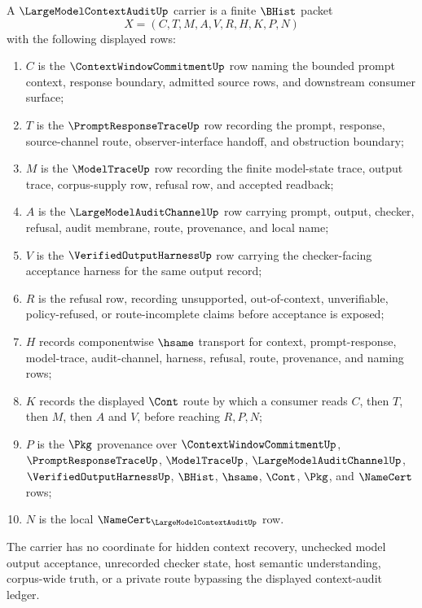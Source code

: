 \begin{definition}
\label{def:large-model-context-audit-carrier}
A $\LargeModelContextAuditUp$ carrier is a finite $\BHist$ packet
$$
X=(C,T,M,A,V,R,H,K,P,N)
$$
with the following displayed rows:
\begin{enumerate}
\item $C$ is the $\ContextWindowCommitmentUp$ row naming the bounded prompt context, response boundary, admitted source rows, and downstream consumer surface;
\item $T$ is the $\PromptResponseTraceUp$ row recording the prompt, response, source-channel route, observer-interface handoff, and obstruction boundary;
\item $M$ is the $\ModelTraceUp$ row recording the finite model-state trace, output trace, corpus-supply row, refusal row, and accepted readback;
\item $A$ is the $\LargeModelAuditChannelUp$ row carrying prompt, output, checker, refusal, audit membrane, route, provenance, and local name;
\item $V$ is the $\VerifiedOutputHarnessUp$ row carrying the checker-facing acceptance harness for the same output record;
\item $R$ is the refusal row, recording unsupported, out-of-context, unverifiable, policy-refused, or route-incomplete claims before acceptance is exposed;
\item $H$ records componentwise $\hsame$ transport for context, prompt-response, model-trace, audit-channel, harness, refusal, route, provenance, and naming rows;
\item $K$ records the displayed $\Cont$ route by which a consumer reads $C$, then $T$, then $M$, then $A$ and $V$, before reaching $R,P,N$;
\item $P$ is the $\Pkg$ provenance over $\ContextWindowCommitmentUp$, $\PromptResponseTraceUp$, $\ModelTraceUp$, $\LargeModelAuditChannelUp$, $\VerifiedOutputHarnessUp$, $\BHist$, $\hsame$, $\Cont$, $\Pkg$, and $\NameCert$ rows;
\item $N$ is the local $\NameCert_{\LargeModelContextAuditUp}$ row.
\end{enumerate}
The carrier has no coordinate for hidden context recovery, unchecked model output acceptance, unrecorded checker state, host semantic understanding, corpus-wide truth, or a private route bypassing the displayed context-audit ledger.
\end{definition}

